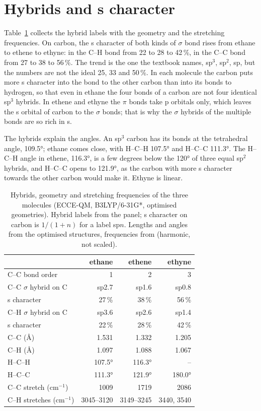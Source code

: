 \section{Hybrids and s character}
Table~\ref{tab:lb-trends} collects the hybrid labels with the geometry and the stretching frequencies. On carbon, the s character of both kinds of $\sigma$ bond rises from ethane to ethene to ethyne: in the C--H bond from 22 to 28 to 42\,\%, in the C--C bond from 27 to 38 to 56\,\%. The trend is the one the textbook names, sp$^3$, sp$^2$, sp, but the numbers are not the ideal 25, 33 and 50\,\%. In each molecule the carbon puts more s character into the bond to the other carbon than into its bonds to hydrogen, so that even in ethane the four bonds of a carbon are not four identical sp$^3$ hybrids. In ethene and ethyne the $\pi$ bonds take p orbitals only, which leaves the s orbital of carbon to the $\sigma$ bonds; that is why the $\sigma$ hybrids of the multiple bonds are so rich in s.

The hybrids explain the angles. An sp$^3$ carbon has its bonds at the tetrahedral angle, \ang{109.5}; ethane comes close, with H--C--H \ang{107.5} and H--C--C \ang{111.3}. The H--C--H angle in ethene, \ang{116.3}, is a few degrees below the \ang{120} of three equal sp$^2$ hybrids, and H--C--C opens to \ang{121.9}, as the carbon with more s character towards the other carbon would make it. Ethyne is linear.

\begin{table}[htbp]
	\centering
	\caption{Hybrids, geometry and stretching frequencies of the three molecules (ECCE-QM, B3LYP/6-31G*, optimised geometries). Hybrid labels from the  panel; s character on carbon is $1/(1+n)$ for a label sp$n$. Lengths and angles from the optimised structures, frequencies from  (harmonic, not scaled).}
	\label{tab:lb-trends}
	\begin{tabular}{lrrr}
		\toprule
		 & ethane & ethene & ethyne \\
		\midrule
		C--C bond order & 1 & 2 & 3 \\
		C--C $\sigma$ hybrid on C & sp2.7 & sp1.6 & sp0.8 \\
		\quad s character & 27\,\% & 38\,\% & 56\,\% \\
		C--H $\sigma$ hybrid on C & sp3.6 & sp2.6 & sp1.4 \\
		\quad s character & 22\,\% & 28\,\% & 42\,\% \\
		\midrule
		C--C (\AA) & 1.531 & 1.332 & 1.205 \\
		C--H (\AA) & 1.097 & 1.088 & 1.067 \\
		H--C--H & \ang{107.5} & \ang{116.3} & -- \\
		H--C--C & \ang{111.3} & \ang{121.9} & \ang{180.0} \\
		\midrule
		C--C stretch (cm$^{-1}$) & 1009 & 1719 & 2086 \\
		C--H stretches (cm$^{-1}$) & 3045--3120 & 3149--3245 & 3440, 3540 \\
		\bottomrule
	\end{tabular}
\end{table}

